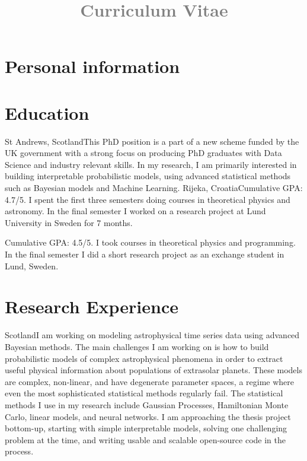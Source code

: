 \documentclass[11pt,a4paper,roman]{moderncv}
\title{\textcolor{gray}{ Curriculum Vitae}}
\begin{document}
\makecvtitle
\section{Personal information}

\section{Education}
{St Andrews, Scotland}{}{This PhD position is a part of a new scheme funded by the UK government
with a strong focus on producing PhD graduates with Data Science and industry relevant skills. 
In my research, I am primarily interested in building interpretable probabilistic models, 
using advanced statistical methods such as Bayesian models and Machine Learning.}
{Rijeka, Croatia}{}{Cumulative GPA: 4.7/5. I spent the first three semesters 
doing courses in theoretical 
physics and astronomy. In the final semester I worked on 
a research project at Lund University in Sweden for 7 months.}

{Cumulative GPA: 4.5/5. I took courses in theoretical physics and programming. In the final 
semester I did a short research project as an exchange student in Lund, Sweden.}

\section{Research Experience}
{Scotland}{}{I am working on modeling astrophysical time series data 
using advanced Bayesian methods.
The main challenges I am working on is how to build 
probabilistic models of complex astrophysical
phenomena in order to extract useful physical information 
about populations of extrasolar planets.
These models are complex, non-linear, and have degenerate parameter spaces, a regime where
even the most sophisticated statistical methods regularly fail. 
The statistical methods I use in my research include Gaussian Processes, Hamiltonian Monte Carlo,
linear models, and neural networks.
I am approaching the thesis project bottom-up, starting with simple interpretable models, solving 
one challenging problem at the time, and writing usable and scalable open-source code 
in the process.} 
\end{document}
